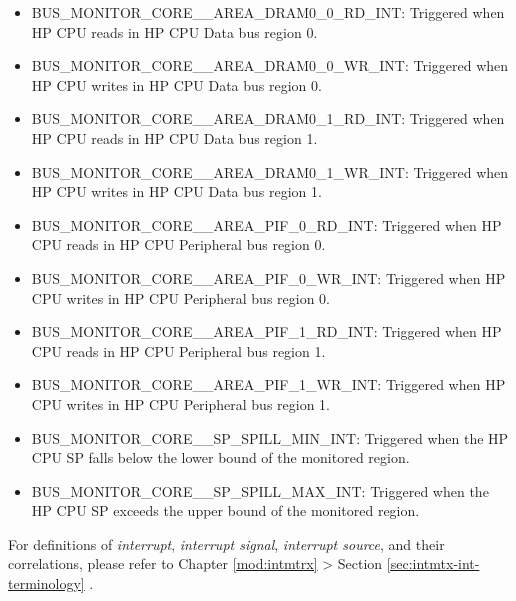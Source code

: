 \documentclass[main\_\_EN.tex]{subfiles}
\begin{document}
\begin{itemize}
    \item \label{int:BUSMONITORCORE0AREADRAM00RDINT}BUS\_MONITOR\_CORE\_\_AREA\_DRAM0\_0\_RD\_INT: Triggered when HP CPU reads in HP CPU Data bus region 0.
    \item \label{int:BUSMONITORCORE0AREADRAM00WRINT}BUS\_MONITOR\_CORE\_\_AREA\_DRAM0\_0\_WR\_INT: Triggered when HP CPU writes in HP CPU Data bus region 0.
    \item \label{int:BUSMONITORCORE0AREADRAM01RDINT}BUS\_MONITOR\_CORE\_\_AREA\_DRAM0\_1\_RD\_INT: Triggered when HP CPU reads in HP CPU Data bus region 1.
    \item \label{int:BUSMONITORCORE0AREADRAM01WRINT}BUS\_MONITOR\_CORE\_\_AREA\_DRAM0\_1\_WR\_INT: Triggered when HP CPU writes in HP CPU Data bus region 1.
    \item \label{int:BUSMONITORCORE0AREAPIF0RDINT}BUS\_MONITOR\_CORE\_\_AREA\_PIF\_0\_RD\_INT: Triggered when HP CPU reads in HP CPU Peripheral bus region 0.
    \item \label{int:BUSMONITORCORE0AREAPIF0WRINT}BUS\_MONITOR\_CORE\_\_AREA\_PIF\_0\_WR\_INT: Triggered when HP CPU writes in HP CPU Peripheral bus region 0.
    \item \label{int:BUSMONITORCORE0AREAPIF1RDINT}BUS\_MONITOR\_CORE\_\_AREA\_PIF\_1\_RD\_INT: Triggered when HP CPU reads in HP CPU Peripheral bus region 1.
    \item \label{int:BUSMONITORCORE0AREAPIF1WRINT}BUS\_MONITOR\_CORE\_\_AREA\_PIF\_1\_WR\_INT: Triggered when HP CPU writes in HP CPU Peripheral bus region 1.
    \item \label{int:BUSMONITORCORE0SPSPILLMININT}BUS\_MONITOR\_CORE\_\_SP\_SPILL\_MIN\_INT: Triggered when the HP CPU SP falls below the lower bound of the monitored region.
    \item \label{int:BUSMONITORCORE0SPSPILLMAXINT}BUS\_MONITOR\_CORE\_\_SP\_SPILL\_MAX\_INT: Triggered when the HP CPU SP exceeds the upper bound of the monitored region.
\end{itemize}

\begin{tiplisting}
    For definitions of \textit{interrupt}, \textit{interrupt signal}, \textit{interrupt source}, and their correlations, please refer to Chapter \ref{mod:intmtrx} \textit{} > Section \ref{sec:intmtx-int-terminology} \textit{}.
\end{tiplisting}
\end{document}

